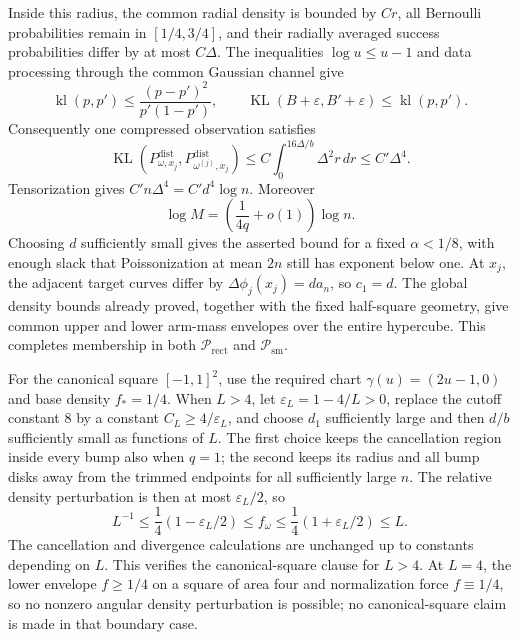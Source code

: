 Inside this radius, the common radial density is bounded by \(Cr\), all Bernoulli probabilities remain in \([1/4,3/4]\), and their radially averaged success probabilities differ by at most \(C\Delta\).  The inequalities \(\log u\leq u-1\) and data processing through the common Gaussian channel give
\[
\operatorname{kl}(p,p')\leq\frac{(p-p')^2}{p'(1-p')},
\qquad
\operatorname{KL}(B+\varepsilon,B'+\varepsilon)\leq\operatorname{kl}(p,p').
\]
Consequently one compressed observation satisfies
\[
\operatorname{KL}(P^{\mathrm{dist}}_{\omega,x_j},P^{\mathrm{dist}}_{\omega^{(j)},x_j})
\leq C\int_0^{16\Delta/b}\Delta^2r\,dr
\leq C'\Delta^4.
\]
Tensorization gives \(C'n\Delta^4=C'd^4\log n\).  Moreover
\[
\log M=\left(\frac{1}{4q}+o(1)\right)\log n.
\]
Choosing \(d\) sufficiently small gives the asserted bound for a fixed \(\alpha<1/8\), with enough slack that Poissonization at mean \(2n\) still has exponent below one.  At \(x_j\), the adjacent target curves differ by \(\Delta\phi_j(x_j)=d a_n\), so \(c_1=d\).  The global density bounds already proved, together with the fixed half-square geometry, give common upper and lower arm-mass envelopes over the entire hypercube.  This completes membership in both \(\mathcal P_{\mathrm{rect}}\) and \(\mathcal P_{\mathrm{sm}}\).

For the canonical square \([-1,1]^2\), use the required chart \(\gamma(u)=(2u-1,0)\) and base density \(f_*=1/4\).  When \(L>4\), let \(\varepsilon_L=1-4/L>0\), replace the cutoff constant \(8\) by a constant \(C_L\geq4/\varepsilon_L\), and choose \(d_1\) sufficiently large and then \(d/b\) sufficiently small as functions of \(L\).  The first choice keeps the cancellation region inside every bump also when \(q=1\); the second keeps its radius and all bump disks away from the trimmed endpoints for all sufficiently large \(n\).  The relative density perturbation is then at most \(\varepsilon_L/2\), so
\[
L^{-1}\leq\frac14(1-\varepsilon_L/2)\leq f_\omega
\leq\frac14(1+\varepsilon_L/2)\leq L.
\]
The cancellation and divergence calculations are unchanged up to constants depending on \(L\).  This verifies the canonical-square clause for \(L>4\).  At \(L=4\), the lower envelope \(f\geq1/4\) on a square of area four and normalization force \(f\equiv1/4\), so no nonzero angular density perturbation is possible; no canonical-square claim is made in that boundary case.